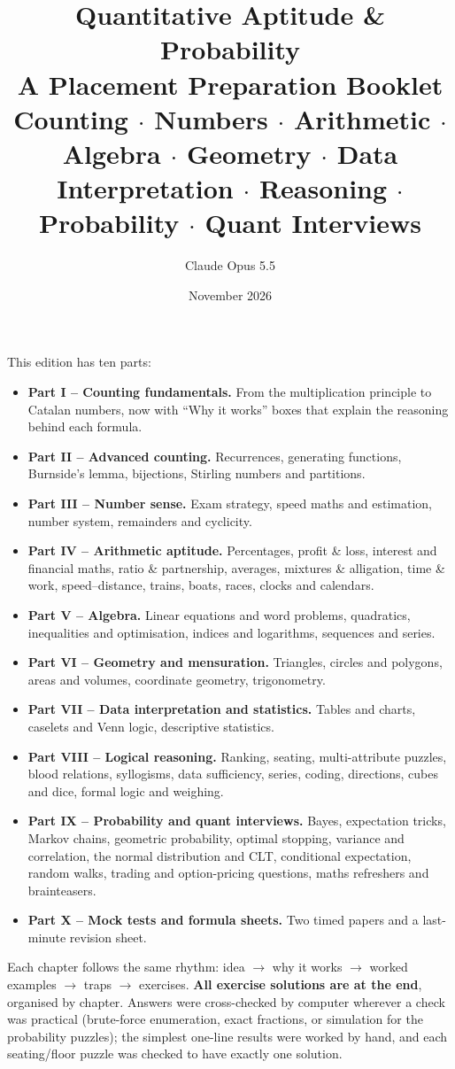 \documentclass[11pt,a4paper,openany]{report}
\title{\textbf{Quantitative Aptitude \& Probability}\\[6pt]
\Large A Placement Preparation Booklet\\[4pt]
\large Counting $\cdot$ Numbers $\cdot$ Arithmetic $\cdot$ Algebra $\cdot$ Geometry $\cdot$ Data Interpretation $\cdot$ Reasoning $\cdot$ Probability $\cdot$ Quant Interviews}
\author{Claude Opus 5.5}
\date{November 2026}
\begin{document}
\maketitle

\begin{idea}
This edition has ten parts:
\begin{itemize}[nosep]
\item \textbf{Part I -- Counting fundamentals.} From the multiplication principle to Catalan numbers, now with ``Why it works'' boxes that explain the reasoning behind each formula.
\item \textbf{Part II -- Advanced counting.} Recurrences, generating functions, Burnside's lemma, bijections, Stirling numbers and partitions.
\item \textbf{Part III -- Number sense.} Exam strategy, speed maths and estimation, number system, remainders and cyclicity.
\item \textbf{Part IV -- Arithmetic aptitude.} Percentages, profit \& loss, interest and financial maths, ratio \& partnership, averages, mixtures \& alligation, time \& work, speed--distance, trains, boats, races, clocks and calendars.
\item \textbf{Part V -- Algebra.} Linear equations and word problems, quadratics, inequalities and optimisation, indices and logarithms, sequences and series.
\item \textbf{Part VI -- Geometry and mensuration.} Triangles, circles and polygons, areas and volumes, coordinate geometry, trigonometry.
\item \textbf{Part VII -- Data interpretation and statistics.} Tables and charts, caselets and Venn logic, descriptive statistics.
\item \textbf{Part VIII -- Logical reasoning.} Ranking, seating, multi-attribute puzzles, blood relations, syllogisms, data sufficiency, series, coding, directions, cubes and dice, formal logic and weighing.
\item \textbf{Part IX -- Probability and quant interviews.} Bayes, expectation tricks, Markov chains, geometric probability, optimal stopping, variance and correlation, the normal distribution and CLT, conditional expectation, random walks, trading and option-pricing questions, maths refreshers and brainteasers.
\item \textbf{Part X -- Mock tests and formula sheets.} Two timed papers and a last-minute revision sheet.
\end{itemize}
Each chapter follows the same rhythm: idea $\to$ why it works $\to$ worked examples $\to$ traps $\to$ exercises.
\textbf{All exercise solutions are at the end}, organised by chapter. Answers were cross-checked by computer
wherever a check was practical (brute-force enumeration, exact fractions, or simulation for the probability puzzles); the simplest one-line results were worked by hand,
and each seating/floor puzzle was checked to have exactly one solution.


\end{idea}
\end{document}

